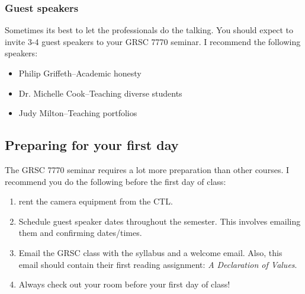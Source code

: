 \subsubsection{Guest speakers}
\label{sec:guest-speakers}

Sometimes its best to let the professionals do the talking.  You should expect to invite 3-4 guest speakers to your GRSC 7770 seminar.  I recommend the following speakers:
\begin{itemize}
\item Philip Griffeth--Academic honesty
\item Dr. Michelle Cook--Teaching diverse students
\item Judy Milton--Teaching portfolios
\end{itemize}



\subsection{Preparing for your first day}
\label{sec:preparing-your-first}

The GRSC 7770 seminar requires a lot more preparation than other courses.  I recommend you do the following before the first day of class:

\begin{enumerate}
\item rent the camera equipment from the CTL.
\item Schedule guest speaker dates throughout the semester.  This involves emailing them and confirming dates/times.
\item Email the GRSC class with the syllabus and a welcome email.  Also, this email should contain their first reading assignment: \emph{A Declaration of Values}. 
\item Always check out your room before your first day of class! 
\end{enumerate}


